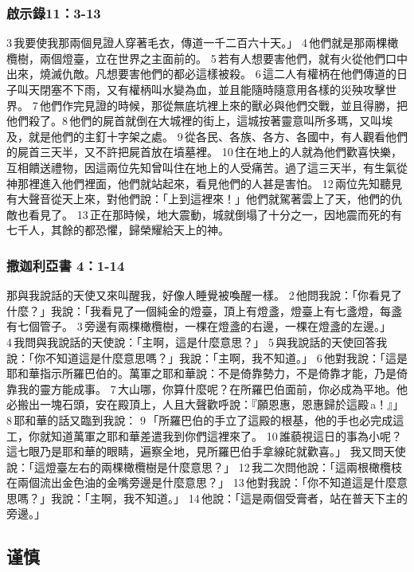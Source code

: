 \subsubsection{啟示錄11：3-13}
 3 我要使我那兩個見證人穿著毛衣，傳道一千二百六十天。」 4 他們就是那兩棵橄欖樹，兩個燈臺，立在世界之主面前的。 5 若有人想要害他們，就有火從他們口中出來，燒滅仇敵。凡想要害他們的都必這樣被殺。 6 這二人有權柄在他們傳道的日子叫天閉塞不下雨，又有權柄叫水變為血，並且能隨時隨意用各樣的災殃攻擊世界。 7 他們作完見證的時候，那從無底坑裡上來的獸必與他們交戰，並且得勝，把他們殺了。8 他們的屍首就倒在大城裡的街上，這城按著靈意叫所多瑪，又叫埃及，就是他們的主釘十字架之處。 9 從各民、各族、各方、各國中，有人觀看他們的屍首三天半，又不許把屍首放在墳墓裡。 10 住在地上的人就為他們歡喜快樂，互相饋送禮物，因這兩位先知曾叫住在地上的人受痛苦。過了這三天半，有生氣從神那裡進入他們裡面，他們就站起來，看見他們的人甚是害怕。 12 兩位先知聽見有大聲音從天上來，對他們說：「上到這裡來！」他們就駕著雲上了天，他們的仇敵也看見了。 13 正在那時候，地大震動，城就倒塌了十分之一，因地震而死的有七千人，其餘的都恐懼，歸榮耀給天上的神。

\subsubsection{撒迦利亞書 4：1-14}
那與我說話的天使又來叫醒我，好像人睡覺被喚醒一樣。 2 他問我說：「你看見了什麼？」我說：「我看見了一個純金的燈臺，頂上有燈盞，燈臺上有七盞燈，每盞有七個管子。 3 旁邊有兩棵橄欖樹，一棵在燈盞的右邊，一棵在燈盞的左邊。」 4 我問與我說話的天使說：「主啊，這是什麼意思？」 5 與我說話的天使回答我說：「你不知道這是什麼意思嗎？」我說：「主啊，我不知道。」 6 他對我說：「這是耶和華指示所羅巴伯的。萬軍之耶和華說：不是倚靠勢力，不是倚靠才能，乃是倚靠我的靈方能成事。 7 大山哪，你算什麼呢？在所羅巴伯面前，你必成為平地。他必搬出一塊石頭，安在殿頂上，人且大聲歡呼說：『願恩惠，恩惠歸於這殿 a！』」 8 耶和華的話又臨到我說： 9 「所羅巴伯的手立了這殿的根基，他的手也必完成這工，你就知道萬軍之耶和華差遣我到你們這裡來了。 10 誰藐視這日的事為小呢？這七眼乃是耶和華的眼睛，遍察全地，見所羅巴伯手拿線砣就歡喜。」
我又問天使說：「這燈臺左右的兩棵橄欖樹是什麼意思？」 12 我二次問他說：「這兩根橄欖枝在兩個流出金色油的金嘴旁邊是什麼意思？」 13 他對我說：「你不知道這是什麼意思嗎？」我說：「主啊，我不知道。」 14 他說：「這是兩個受膏者，站在普天下主的旁邊。」






\subsection{谨慎}
